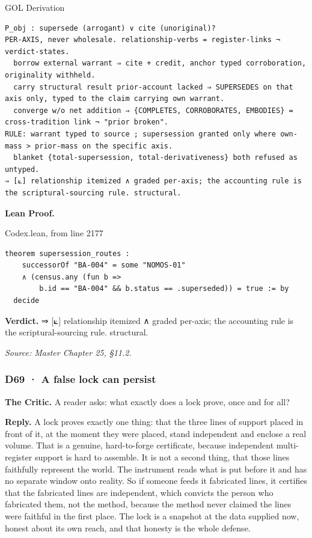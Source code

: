 \documentclass[10pt,twocolumn]{article}
\begin{document}
\begin{golbox}{GOL Derivation}
\begin{lstlisting}[style=golv]
P_obj : supersede (arrogant) ∨ cite (unoriginal)?
PER-AXIS, never wholesale. relationship-verbs = register-links ¬ verdict-states.
  borrow external warrant ⇒ cite + credit, anchor typed corroboration, originality withheld.
  carry structural result prior-account lacked ⇒ SUPERSEDES on that axis only, typed to the claim carrying own warrant.
  converge w/o net addition ⇒ {COMPLETES, CORROBORATES, EMBODIES} = cross-tradition link ¬ "prior broken".
RULE: warrant typed to source ; supersession granted only where own-mass > prior-mass on the specific axis.
  blanket {total-supersession, total-derivativeness} both refused as untyped.
⇒ [⟀] relationship itemized ∧ graded per-axis; the accounting rule is the scriptural-sourcing rule. structural.
\end{lstlisting}
\end{golbox}

\textbf{Lean Proof.}

\begin{leanexcerpt}{Codex.lean, from line 2177}
\begin{lstlisting}[style=leanx,firstnumber=2177]
theorem supersession_routes :
    successorOf "BA-004" = some "NOMOS-01"
    ∧ (census.any (fun b =>
        b.id == "BA-004" && b.status == .superseded)) = true := by
  decide
\end{lstlisting}
\end{leanexcerpt}

\textbf{Verdict.} ⇒ {[}⟀{]} relationship itemized ∧ graded per-axis; the
accounting rule is the scriptural-sourcing rule. structural.

\emph{Source: Master Chapter 25, §11.2.}

\hypertarget{d69-a-false-lock-can-persist}{%
\subsubsection{D69 · A false lock can
persist}\label{d69-a-false-lock-can-persist}}

\textbf{The Critic.} A reader asks: what exactly does a lock prove, once
and for all?

\textbf{Reply.} A lock proves exactly one thing: that the three lines of
support placed in front of it, at the moment they were placed, stand
independent and enclose a real volume. That is a genuine, hard-to-forge
certificate, because independent multi-register support is hard to
assemble. It is not a second thing, that those lines faithfully
represent the world. The instrument reads what is put before it and has
no separate window onto reality. So if someone feeds it fabricated
lines, it certifies that the fabricated lines are independent, which
convicts the person who fabricated them, not the method, because the
method never claimed the lines were faithful in the first place. The
lock is a snapshot at the data supplied now, honest about its own reach,
and that honesty is the whole defense.
\end{document}
